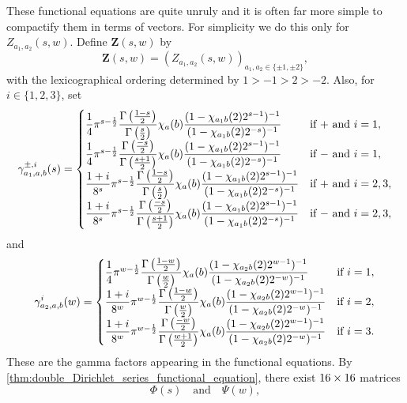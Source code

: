 \documentclass[12pt,reqno,oneside]{amsart}
\begin{document}
    These functional equations are quite unruly and it is often far more simple to compactify them in terms of vectors. For simplicity we do this only for $Z_{a_{1},a_{2}}(s,w)$. Define $\mathbf{Z}(s,w)$ by
    \[
        \mathbf{Z}(s,w) = (Z_{a_{1},a_{2}}(s,w))_{a_{1},a_{2} \in \{\pm 1, \pm 2\}},
    \]
    with the lexicographical ordering determined by $1 > -1 > 2 > -2$. Also, for $i \in \{1,2,3\}$, set
    \[
        \gamma_{a_{1},a,b}^{\pm,i}(s) = \begin{cases} \dfrac{1}{4}\pi^{s-\frac{1}{2}}\dfrac{\Gamma\left(\frac{1-s}{2}\right)}{\Gamma\left(\frac{s}{2}\right)}\chi_{a}(b)\dfrac{(1-\chi_{a_{1}b}(2)2^{s-1})^{-1}}{(1-\chi_{a_{1}b}(2)2^{-s})^{-1}} & \text{if $+$ and $i = 1$}, \\ \dfrac{1}{4}\pi^{s-\frac{1}{2}}\dfrac{\Gamma\left(\frac{-s}{2}\right)}{\Gamma\left(\frac{s+1}{2}\right)}\chi_{a}(b)\dfrac{(1-\chi_{a_{1}b}(2)2^{s-1})^{-1}}{(1-\chi_{a_{1}b}(2)2^{-s})^{-1}} & \text{if $-$ and $i = 1$}, \\ \dfrac{1+i}{8^{s}}\pi^{s-\frac{1}{2}}\dfrac{\Gamma\left(\frac{1-s}{2}\right)}{\Gamma\left(\frac{s}{2}\right)}\chi_{a}(b)\dfrac{(1-\chi_{a_{1}b}(2)2^{s-1})^{-1}}{(1-\chi_{a_{1}b}(2)2^{-s})^{-1}} & \text{if $+$ and $i = 2,3$}, \\ \dfrac{1+i}{8^{s}}\pi^{s-\frac{1}{2}}\dfrac{\Gamma\left(\frac{-s}{2}\right)}{\Gamma\left(\frac{s+1}{2}\right)}\chi_{a}(b)\dfrac{(1-\chi_{a_{1}b}(2)2^{s-1})^{-1}}{(1-\chi_{a_{1}b}(2)2^{-s})^{-1}} & \text{if $-$ and $i = 2,3$}, \end{cases}
    \]
    and
    \[
        \gamma_{a_{2},a,b}^{i}(w) = \begin{cases} \dfrac{1}{4}\pi^{w-\frac{1}{2}}\dfrac{\Gamma\left(\frac{1-w}{2}\right)}{\Gamma\left(\frac{w}{2}\right)}\chi_{a}(b)\dfrac{(1-\chi_{a_{2}b}(2)2^{w-1})^{-1}}{(1-\chi_{a_{2}b}(2)2^{-w})^{-1}} & \text{if $i = 1$}, \\ \dfrac{1+i}{8^{w}}\pi^{w-\frac{1}{2}}\dfrac{\Gamma\left(\frac{1-w}{2}\right)}{\Gamma\left(\frac{w}{2}\right)}\chi_{a}(b)\dfrac{(1-\chi_{a_{2}b}(2)2^{w-1})^{-1}}{(1-\chi_{a_{2}b}(2)2^{-w})^{-1}} & \text{if $i = 2$}, \\ \dfrac{1+i}{8^{w}}\pi^{w-\frac{1}{2}}\dfrac{\Gamma\left(\frac{-w}{2}\right)}{\Gamma\left(\frac{w+1}{2}\right)}\chi_{a}(b)\dfrac{(1-\chi_{a_{2}b}(2)2^{w-1})^{-1}}{(1-\chi_{a_{2}b}(2)2^{-w})^{-1}} & \text{if $i = 3$}. \end{cases}
    \]
    These are the gamma factors appearing in the functional equations. By \cref{thm:double_Dirichlet_series_functional_equation}, there exist $16 \times 16$ matrices
    \[
        \Phi(s) \quad \text{and} \quad \Psi(w),
    \]
\end{document}

